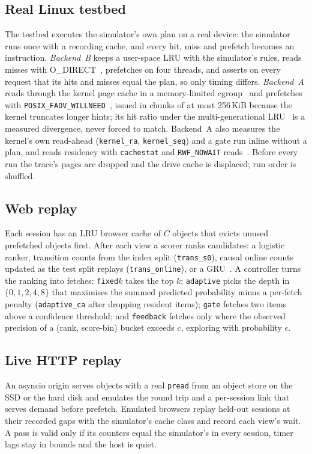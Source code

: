 \subsection{Real Linux testbed}\label{sec:systems-realio}
The testbed executes the simulator's own plan on a real device: the simulator
runs once with a recording cache, and every hit, miss and prefetch becomes an
instruction. \emph{Backend~B} keeps a user-space LRU with the simulator's
rules, reads misses with O\_DIRECT~\cite{man_open}, prefetches on four
threads, and asserts on every request that its hits and misses equal the plan,
so only timing differs. \emph{Backend~A} reads through the kernel page cache in
a memory-limited cgroup~\cite{linux_cgroup_v2} and prefetches with
\texttt{POSIX\_FADV\_WILLNEED}~\cite{man_posix_fadvise}, issued in chunks of at
most 256\,KiB because the kernel truncates longer hints; its hit ratio under
the multi-generational LRU~\cite{linux_mglru} is a measured divergence, never
forced to match. Backend~A also measures the kernel's own read-ahead
(\texttt{kernel\_ra}, \texttt{kernel\_seq}) and a gate run inline without a
plan, and reads residency with \texttt{cachestat} and \texttt{RWF\_NOWAIT}
reads~\cite{man_cachestat,man_readv}. Before every run the trace's pages are
dropped and the drive cache is displaced; run order is shuffled.

\subsection{Web replay}\label{sec:systems-web}
Each session has an LRU browser cache of $C$ objects that evicts unused
prefetched objects first. After each view a scorer ranks candidates: a
logistic ranker, transition counts from the index split
(\texttt{trans\_s0}), causal online counts updated as the test split replays
(\texttt{trans\_online}), or a GRU~\cite{hidasi2016session}. A controller
turns the ranking into fetches: \texttt{fixed}$k$ takes the top $k$;
\texttt{adaptive} picks the depth in $\{0,1,2,4,8\}$ that maximises the summed
predicted probability minus a per-fetch penalty (\texttt{adaptive\_ca} after
dropping resident items); \texttt{gate} fetches two items above a confidence
threshold; and \texttt{feedback} fetches only where the observed precision of
a (rank, score-bin) bucket exceeds $c$, exploring with probability $\epsilon$.

\subsection{Live HTTP replay}\label{sec:systems-live}
An asyncio origin serves objects with a real \texttt{pread} from an object
store on the SSD or the hard disk and emulates the round trip and a
per-session link that serves demand before prefetch. Emulated browsers replay
held-out sessions at their recorded gaps with the simulator's cache class and
record each view's wait. A pass is valid only if its counters equal the
simulator's in every session, timer lags stay in bounds and the host is quiet.
